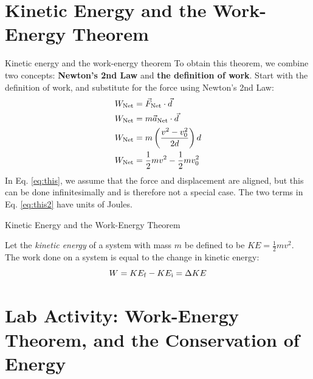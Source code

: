 \documentclass{beamer}
\begin{document}
\section{Kinetic Energy and the Work-Energy Theorem}

\begin{frame}{Kinetic energy and the work-energy theorem}
To obtain this theorem, we combine two concepts: \alert{\textbf{Newton's 2nd Law}} and \alert{\textbf{the definition of work}}.  Start with the definition of work, and substitute for the force using Newton's 2nd Law:
\begin{align}
W_{\rm Net} &= \vec{F}_{\rm Net} \cdot \vec{d} \\
W_{\rm Net} &= m\vec{a}_{\rm Net} \cdot \vec{d} \\
W_{\rm Net} &= m\left(\frac{v^2-v_{\rm 0}^2}{2d}\right) d \label{eq:this} \\
W_{\rm Net} &= \frac{1}{2}mv^2 - \frac{1}{2}mv_{\rm 0}^2 \label{eq:this2}
\end{align}
In Eq. \ref{eq:this}, we assume that the force and displacement are aligned, but this can be done infinitesimally and is therefore not a special case. The two terms in Eq. \ref{eq:this2} have units of Joules.
\end{frame}

\begin{frame}{Kinetic Energy and the Work-Energy Theorem}
\begin{tcolorbox}[colback=white,colframe=red!40!blue,title=The Work-Energy Theorem]
\small
\alert{
Let the \textit{kinetic energy} of a system with mass $m$ be defined to be $KE = \frac{1}{2}mv^2$.  The work done on a system is equal to the change in kinetic energy:
\begin{equation}
W = KE_{\rm f} - KE_{\rm i} = \Delta KE
\end{equation}
}
\end{tcolorbox}
\end{frame}

\section{Lab Activity: Work-Energy Theorem, and the Conservation of Energy}
\end{document}
